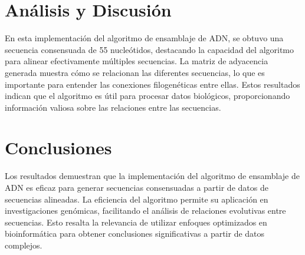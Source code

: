 \documentclass{article}
\begin{document}
\section{Análisis y Discusión}
En esta implementación del algoritmo de ensamblaje de ADN, se obtuvo una secuencia consensuada de 55 nucleótidos, destacando la capacidad del algoritmo para alinear efectivamente múltiples secuencias. La matriz de adyacencia generada muestra cómo se relacionan las diferentes secuencias, lo que es importante para entender las conexiones filogenéticas entre ellas. Estos resultados indican que el algoritmo es útil para procesar datos biológicos, proporcionando información valiosa sobre las relaciones entre las secuencias.

\section{Conclusiones}
Los resultados demuestran que la implementación del algoritmo de ensamblaje de ADN es eficaz para generar secuencias consensuadas a partir de datos de secuencias alineadas. La eficiencia del algoritmo permite su aplicación en investigaciones genómicas, facilitando el análisis de relaciones evolutivas entre secuencias. Esto resalta la relevancia de utilizar enfoques optimizados en bioinformática para obtener conclusiones significativas a partir de datos complejos.
\end{document}
